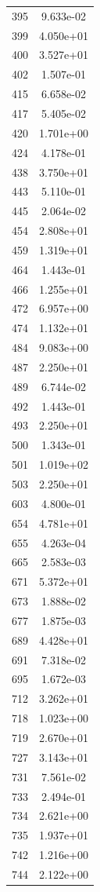 \documentclass[12pt]{article}
\begin{document}
\begin{longtable}{@{}cc@{}}
395 & 9.633e-02 \\
399 & 4.050e+01 \\
400 & 3.527e+01 \\
402 & 1.507e-01 \\
415 & 6.658e-02 \\
417 & 5.405e-02 \\
420 & 1.701e+00 \\
424 & 4.178e-01 \\
438 & 3.750e+01 \\
443 & 5.110e-01 \\
445 & 2.064e-02 \\
454 & 2.808e+01 \\
459 & 1.319e+01 \\
464 & 1.443e-01 \\
466 & 1.255e+01 \\
472 & 6.957e+00 \\
474 & 1.132e+01 \\
484 & 9.083e+00 \\
487 & 2.250e+01 \\
489 & 6.744e-02 \\
492 & 1.443e-01 \\
493 & 2.250e+01 \\
500 & 1.343e-01 \\
501 & 1.019e+02 \\
503 & 2.250e+01 \\
603 & 4.800e-01 \\
654 & 4.781e+01 \\
655 & 4.263e-04 \\
665 & 2.583e-03 \\
671 & 5.372e+01 \\
673 & 1.888e-02 \\
677 & 1.875e-03 \\
689 & 4.428e+01 \\
691 & 7.318e-02 \\
695 & 1.672e-03 \\
712 & 3.262e+01 \\
718 & 1.023e+00 \\
719 & 2.670e+01 \\
727 & 3.143e+01 \\
731 & 7.561e-02 \\
733 & 2.494e-01 \\
734 & 2.621e+00 \\
735 & 1.937e+01 \\
742 & 1.216e+00 \\
744 & 2.122e+00 \\

\end{longtable}
\end{document}
